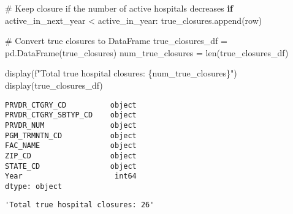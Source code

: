 \documentclass[
  letterpaper,
  DIV=11,
  numbers=noendperiod]{scrartcl}
\newenvironment{Shaded}{\begin{snugshade}}{\end{snugshade}}
\newcommand{\BuiltInTok}[1]{\textcolor[rgb]{0.00,0.23,0.31}{#1}}
\newcommand{\CommentTok}[1]{\textcolor[rgb]{0.37,0.37,0.37}{#1}}
\newcommand{\ControlFlowTok}[1]{\textcolor[rgb]{0.00,0.23,0.31}{\textbf{#1}}}
\newcommand{\NormalTok}[1]{\textcolor[rgb]{0.00,0.23,0.31}{#1}}
\newcommand{\OperatorTok}[1]{\textcolor[rgb]{0.37,0.37,0.37}{#1}}
\newcommand{\SpecialCharTok}[1]{\textcolor[rgb]{0.37,0.37,0.37}{#1}}
\newcommand{\SpecialStringTok}[1]{\textcolor[rgb]{0.13,0.47,0.30}{#1}}
\begin{document}
\begin{Shaded}
\begin{Highlighting}[]
    \CommentTok{\# Keep closure if the number of active hospitals decreases}
    \ControlFlowTok{if}\NormalTok{ active\_in\_next\_year }\OperatorTok{\textless{}}\NormalTok{ active\_in\_year:}
\NormalTok{        true\_closures.append(row)}

\CommentTok{\# Convert true closures to DataFrame}
\NormalTok{true\_closures\_df }\OperatorTok{=}\NormalTok{ pd.DataFrame(true\_closures)}
\NormalTok{num\_true\_closures }\OperatorTok{=} \BuiltInTok{len}\NormalTok{(true\_closures\_df)}

\NormalTok{display(}\SpecialStringTok{f"Total true hospital closures: }\SpecialCharTok{\{}\NormalTok{num\_true\_closures}\SpecialCharTok{\}}\SpecialStringTok{"}\NormalTok{)}
\NormalTok{display(true\_closures\_df) }
\end{Highlighting}
\end{Shaded}

\begin{verbatim}
PRVDR_CTGRY_CD          object
PRVDR_CTGRY_SBTYP_CD    object
PRVDR_NUM               object
PGM_TRMNTN_CD           object
FAC_NAME                object
ZIP_CD                  object
STATE_CD                object
Year                     int64
dtype: object
\end{verbatim}

\begin{verbatim}
'Total true hospital closures: 26'
\end{verbatim}
\end{document}
